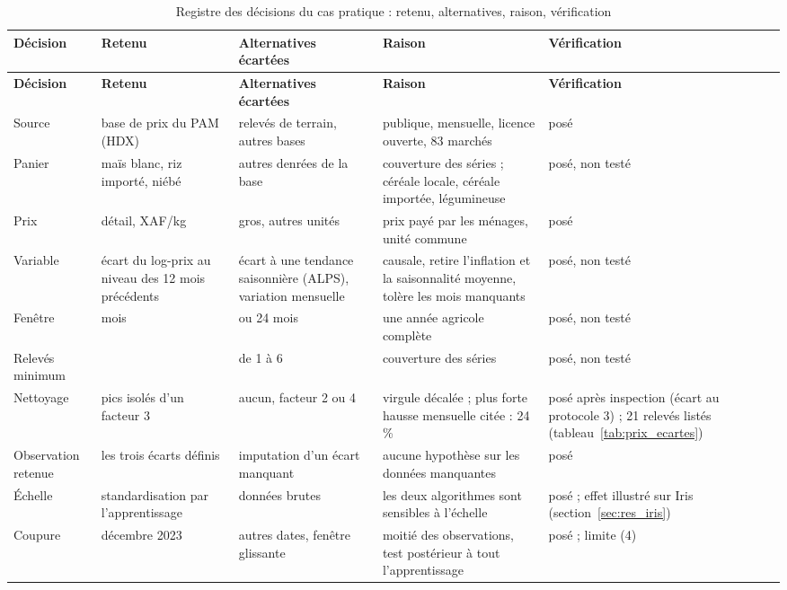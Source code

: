 {\scriptsize
\setlength{\tabcolsep}{3pt}
\begin{longtable}{>{\raggedright\arraybackslash}p{1.9cm}>{\raggedright\arraybackslash}p{2.9cm}>{\raggedright\arraybackslash}p{2.9cm}>{\raggedright\arraybackslash}p{3.9cm}>{\raggedright\arraybackslash}p{3.0cm}}
\caption{Registre des décisions du cas pratique : retenu, alternatives, raison, vérification}\label{tab:registre_decisions_prix}\\
\toprule
\textbf{Décision} & \textbf{Retenu} & \textbf{Alternatives écartées} & \textbf{Raison} & \textbf{Vérification} \\
\midrule
\endfirsthead
\toprule
\textbf{Décision} & \textbf{Retenu} & \textbf{Alternatives écartées} & \textbf{Raison} & \textbf{Vérification} \\
\midrule
\endhead
\bottomrule
\endfoot
Source & base de prix du PAM (HDX) & relevés de terrain, autres bases & publique, mensuelle, licence ouverte, 83 marchés & posé \\
Panier & maïs blanc, riz importé, niébé & autres denrées de la base & couverture des séries ; céréale locale, céréale importée, légumineuse & posé, non testé \\
Prix & détail, XAF/kg & gros, autres unités & prix payé par les ménages, unité commune & posé \\
Variable & écart du log-prix au niveau des 12 mois précédents & écart à une tendance saisonnière (ALPS), variation mensuelle & causale, retire l'inflation et la saisonnalité moyenne, tolère les mois manquants & posé, non testé \\
Fenêtre & 12 mois & 6 ou 24 mois & une année agricole complète & posé, non testé \\
Relevés minimum & 3 & de 1 à 6 & couverture des séries & posé, non testé \\
Nettoyage & pics isolés d'un facteur 3 & aucun, facteur 2 ou 4 & virgule décalée ; plus forte hausse mensuelle citée : 24 \% & posé après inspection (écart au protocole 3) ; 21 relevés listés (tableau~\ref{tab:prix_ecartes}) \\
Observation retenue & les trois écarts définis & imputation d'un écart manquant & aucune hypothèse sur les données manquantes & posé \\
Échelle & standardisation par l'apprentissage & données brutes & les deux algorithmes sont sensibles à l'échelle & posé ; effet illustré sur Iris (section~\ref{sec:res_iris}) \\
Coupure & décembre 2023 & autres dates, fenêtre glissante & moitié des observations, test postérieur à tout l'apprentissage & posé ; limite (4) \\

\end{longtable}}

